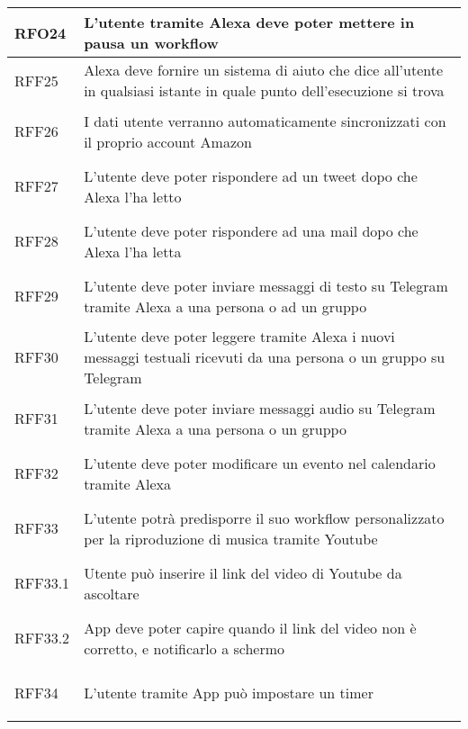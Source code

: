 \begin{longtable}{|>{\centering}m{5em}|m{25em}|}
	\hypertarget{RFO24}{RFO24} & L'utente tramite Alexa deve poter mettere in pausa un workflow\\ \hline
	
	\hypertarget{RFF25}{RFF25} & Alexa deve fornire un sistema di aiuto che dice all'utente in qualsiasi istante in quale punto dell'esecuzione si trova\\ \hline
	
	\hypertarget{RFF26}{RFF26} & I dati utente verranno automaticamente sincronizzati con il proprio account Amazon\\ \hline
	
	\hypertarget{RFF27}{RFF27} & L'utente deve poter rispondere ad un tweet dopo che Alexa l'ha letto\\ \hline
	
	\hypertarget{RFF28}{RFF28} & L'utente deve poter rispondere ad una mail dopo che Alexa l'ha letta\\ \hline
	
	\hypertarget{RFF29}{RFF29} & L'utente deve poter inviare messaggi di testo su Telegram tramite Alexa a una persona o ad un gruppo\\ \hline
	
	\hypertarget{RFF30}{RFF30} &  L'utente deve poter leggere tramite Alexa i nuovi messaggi testuali ricevuti da una persona o un gruppo su Telegram\\ \hline
	
	\hypertarget{RFF31}{RFF31} & L'utente deve poter inviare messaggi audio su Telegram tramite Alexa a una persona o un gruppo\\ \hline
	
	\hypertarget{RFF32}{RFF32} & L'utente deve poter modificare un evento nel calendario tramite Alexa\\ \hline
	
	\hypertarget{RFF33}{RFF33} & L'utente potrà predisporre il suo workflow personalizzato per la riproduzione di musica tramite Youtube\\ \hline
	
	\hypertarget{RFF33.1}{RFF33.1} & Utente può inserire il link del video di Youtube da ascoltare\\ \hline
	
	\hypertarget{RFF33.2}{RFF33.2} & App deve poter capire quando il link del video non è corretto, e notificarlo a schermo\\ \hline
	
	\hypertarget{RFF34}{RFF34} & L'utente tramite App può impostare un timer\\ \hline
	

\end{longtable}
